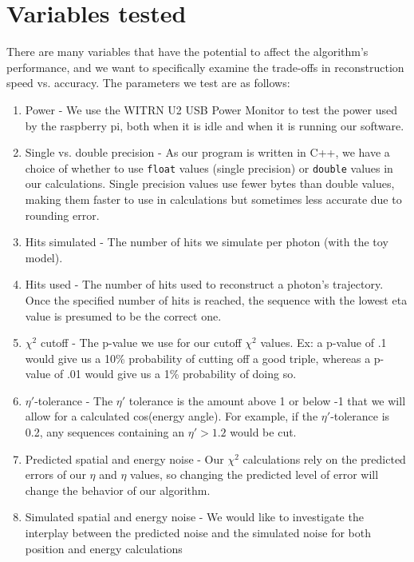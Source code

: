 \section{Variables tested}
There are many variables that have the potential to affect the algorithm's performance, and we want to specifically examine the trade-offs in reconstruction speed vs. accuracy. The parameters we test are as follows:

\begin{enumerate}
    \item Power - We use the WITRN U2 USB Power Monitor to test the power used by the raspberry pi, both when it is idle and when it is running our software.
    \item Single vs. double precision - As our program is written in C++, we have a choice of whether to use \texttt{float} values (single precision) or \texttt{double} values in our calculations. Single precision values use fewer bytes than double values, making them faster to use in calculations but sometimes less accurate due to rounding error.
    \item Hits simulated - The number of hits we simulate per photon (with the toy model).
    \item Hits used - The number of hits used to reconstruct a photon's trajectory. Once the specified number of hits is reached, the sequence with the lowest eta value is presumed to be the correct one.
    \item $\chi^2$ cutoff - The p-value we use for our cutoff $\chi^2$ values. Ex: a p-value of .1 would give us a 10\% probability of cutting off a good triple, whereas a p-value of .01 would give us a 1\% probability of doing so.
    \item $\eta'$-tolerance - The $\eta'$ tolerance is the amount above 1 or below -1 that we will allow for a calculated cos(energy angle). For example, if the $\eta'$-tolerance is 0.2, any sequences containing an $\eta' > 1.2$ would be cut.
    \item Predicted spatial and energy noise - Our $\chi^2$ calculations rely on the predicted errors of our $\eta$ and $\eta$ values, so changing the predicted level of error will change the behavior of our algorithm.
    \item Simulated spatial and energy noise - We would like to investigate the interplay between the predicted noise and the simulated noise for both position and energy calculations
\end{enumerate}